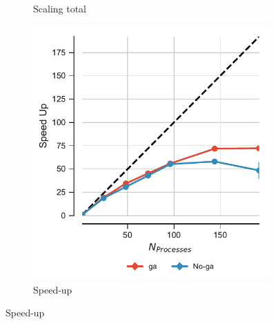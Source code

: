\begin{figure}[ht!]
\begin{subfigure}{.3\textwidth}
  \caption{Scaling total}
  \label{fig:MPItottime-chain-reader}
\end{subfigure}
\hfill
\begin{subfigure}{.3\textwidth}
  \includegraphics[width=\linewidth]{figures/Comparison_Speed_UP_traj_splitting-chain-reader.pdf}
  \caption{Speed-up}
  \label{fig:MPIspeedup-chain-reader}
\end{subfigure}
\bigskip


\end{figure}
